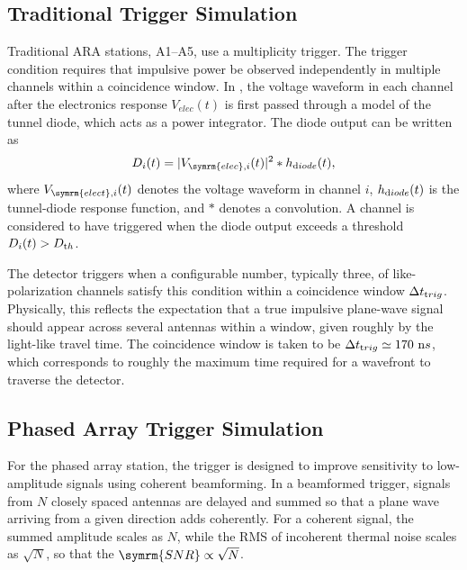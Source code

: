         \subsection{Traditional Trigger Simulation}

        Traditional ARA stations, A1--A5, use a
        multiplicity trigger.
        The trigger condition requires that impulsive power be observed independently in multiple channels
        within a coincidence window.
        In \arasim{}, the voltage waveform in each channel after the electronics response $V_{elec}(t)$ is first passed through a model of the tunnel diode, which acts as a power integrator.
        The diode output can be written as
        \begin{equation}
        D_i(t) = |V_{\symrm{elec}, i}(t)|^2 * h_{\textrm diode}(t),
        \end{equation}
        where $V_{\symrm{elect}, i}(t)$ denotes the voltage waveform in channel $i$, $h_{\textrm diode}(t)$ is the tunnel-diode response function, and $*$ denotes a convolution.
        A channel is considered to have triggered when the diode output exceeds a threshold $
        D_i(t) > D_{\textrm th}$.
        
        The detector triggers when a configurable number, typically three, of like-polarization channels satisfy this condition within a coincidence window $\Delta t_{\textrm trig}$.
        Physically, this reflects the expectation that a true impulsive plane-wave signal should appear across several antennas within a window, given roughly by the light-like travel time.
        The coincidence window is taken to be $\Delta t_{\textrm trig} \simeq 170~{\textrm ns}$, which corresponds to roughly the maximum time required for a wavefront to traverse the detector.
        
        \subsection{Phased Array Trigger Simulation}

        For the phased array station, the trigger is designed to improve sensitivity to low-amplitude signals using coherent beamforming.
        In a beamformed trigger, signals from $N$ closely spaced antennas are delayed and summed so that a plane wave arriving from a given direction adds coherently.
        For a coherent signal, the summed amplitude scales as $N$, while the RMS of incoherent thermal noise scales as $\sqrt{N}$, so that the $\symrm{SNR} \propto \sqrt{N}$.

